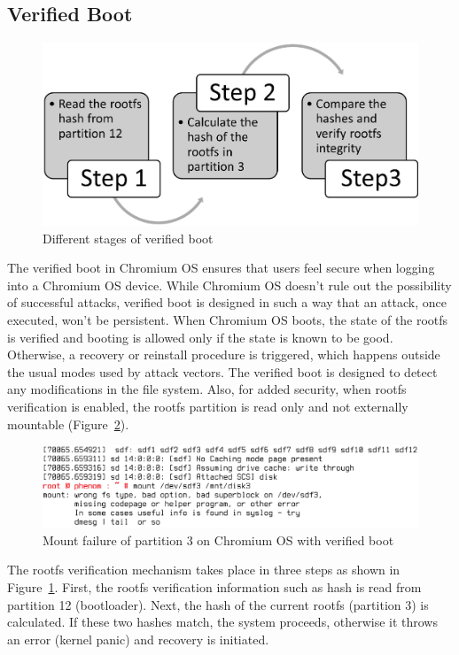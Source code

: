 \documentclass[11pt]{article}
\begin{document}
\subsection{Verified Boot}
\label{verified_boot}
\begin{figure}[htbp]
  \centering
    \includegraphics[scale=0.4]{Figure/verified-boot.eps}
\caption{\small{Different stages of verified boot}}
\label{fig:verified-boot}
\end{figure}
The verified boot in Chromium OS ensures that users feel secure when logging into a Chromium OS device.
While Chromium OS doesn't rule out the possibility of successful attacks,
verified boot is designed in such a way that an attack, once executed,
won't be persistent. When Chromium OS boots, the state of the rootfs is verified and booting is allowed only if the
state is known to be good. Otherwise, a recovery or reinstall procedure
is triggered, which happens outside the usual modes used by attack vectors.
The verified boot is designed to detect any modifications in the file system. Also, for added security, when rootfs verification is enabled, the rootfs partition is read only and not externally mountable (Figure~\ref{fig:dmesg-mount-verified}).
\begin{figure}[htbp]
  \centering
    \includegraphics[scale=.28]{Figure/dmesg-mount-verified.eps}
\caption{\small{Mount failure of partition 3 on Chromium OS with verified boot}}
\label{fig:dmesg-mount-verified}
\end{figure}
The rootfs verification mechanism takes place in three steps as shown in Figure~\ref{fig:verified-boot}. First, the rootfs verification information such as hash is read from partition 12 (bootloader). Next, the hash of the current rootfs (partition 3) is calculated. If these two hashes match, the system proceeds, otherwise it throws an error (kernel panic) and recovery is initiated. 
\end{document}
